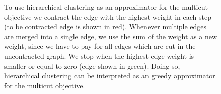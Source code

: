 \begin{center}
\begin{figure}
\caption{
    To use hierarchical clustering as an approximator for
    the multicut objective we contract the edge with the highest weight
    in each step (to be contracted edge is shown in red). 
    Whenever multiple edges are merged into a single edge,
    we use the sum of the weight as a new weight, since
    we have to pay for all edges which are cut in the uncontracted 
    graph.
    We stop when the highest edge weight is smaller
    or equal to zero (edge shown in green).
    Doing so, hierarchical clustering can be
    interpreted as an greedy approximator for
    the multicut objective.
}\label{fig:hc_proposal}
\end{figure}
\end{center}



